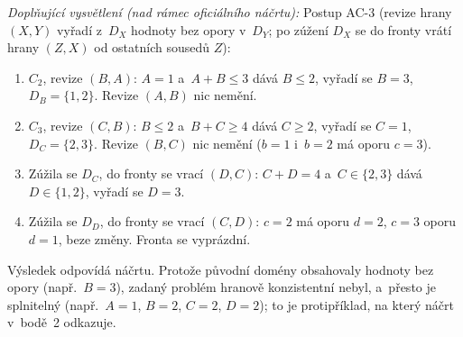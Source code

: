 \medskip
\noindent\textit{Doplňující vysvětlení (nad rámec oficiálního náčrtu):} Postup AC-3 (revize hrany $(X,Y)$ vyřadí z~$D_X$ hodnoty bez opory v~$D_Y$; po zúžení $D_X$ se do fronty vrátí hrany $(Z,X)$ od ostatních sousedů $Z$):
\begin{enumerate}[nosep]
  \item $C_2$, revize $(B,A)$: $A=1$ a~$A+B\le3$ dává $B\le2$, vyřadí se $B=3$, $D_B=\{1,2\}$. Revize $(A,B)$ nic nemění.
  \item $C_3$, revize $(C,B)$: $B\le2$ a~$B+C\ge4$ dává $C\ge2$, vyřadí se $C=1$, $D_C=\{2,3\}$. Revize $(B,C)$ nic nemění ($b=1$ i~$b=2$ má oporu $c=3$).
  \item Zúžila se $D_C$, do fronty se vrací $(D,C)$: $C+D=4$ a~$C\in\{2,3\}$ dává $D\in\{1,2\}$, vyřadí se $D=3$.
  \item Zúžila se $D_D$, do fronty se vrací $(C,D)$: $c=2$ má oporu $d=2$, $c=3$ oporu $d=1$, beze změny. Fronta se vyprázdní.
\end{enumerate}
Výsledek odpovídá náčrtu. Protože původní domény obsahovaly hodnoty bez opory (např.\ $B=3$), zadaný problém hranově konzistentní nebyl, a~přesto je splnitelný (např.\ $A=1$, $B=2$, $C=2$, $D=2$); to je protipříklad, na který náčrt v~bodě~2 odkazuje.
